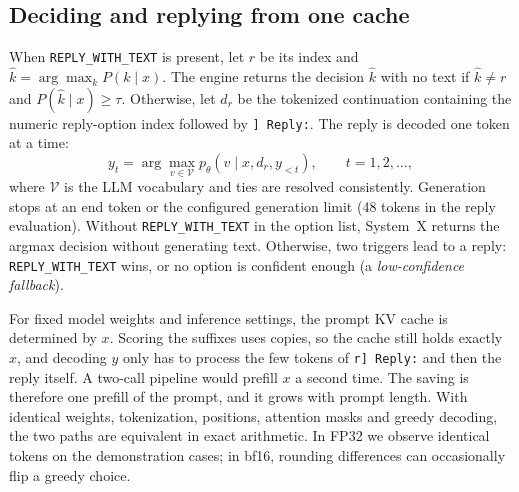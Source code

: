 \documentclass[11pt]{article}
\newcommand{\reply}{\texttt{REPLY\_WITH\_TEXT}}
\begin{document}
\subsection{Deciding and replying from one cache}
When \reply{} is present, let $r$ be its index and $\hat k=\arg\max_k P(k\mid x)$. The engine returns the decision $\hat k$ with no text if $\hat k\neq r$ and $P(\hat k\mid x)\ge\tau$. Otherwise, let $d_r$ be the tokenized continuation containing the numeric reply-option index followed by \texttt{] Reply:}. The reply is decoded one token at a time:
\begin{equation}
y_t=\arg\max_{v\in\mathcal V}p_\theta\!\left(v\mid x,d_r,y_{<t}\right),\qquad t=1,2,\ldots,
\end{equation}
where $\mathcal V$ is the LLM vocabulary and ties are resolved consistently. Generation stops at an end token or the configured generation limit (48 tokens in the reply evaluation). Without \reply{} in the option list, System~X returns the argmax decision without generating text. Otherwise, two triggers lead to a reply: \reply{} wins, or no option is confident enough (a \emph{low-confidence fallback}).

For fixed model weights and inference settings, the prompt KV cache is determined by $x$. Scoring the suffixes uses copies, so the cache still holds exactly $x$, and decoding $y$ only has to process the few tokens of \texttt{r] Reply:} and then the reply itself. A two-call pipeline would prefill $x$ a second time. The saving is therefore one prefill of the prompt, and it grows with prompt length. With identical weights, tokenization, positions, attention masks and greedy decoding, the two paths are equivalent in exact arithmetic. In FP32 we observe identical tokens on the demonstration cases; in bf16, rounding differences can occasionally flip a greedy choice.
\end{document}
